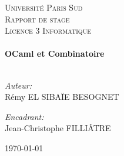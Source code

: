 \begin{titlepage}

\begin{center}



\textsc{\LARGE Université Paris Sud}\\[1.5cm]

\textsc{\Large Rapport de stage}\\[0.5cm]

\textsc{\Large Licence 3 Informatique}\\[0.5cm]

\HRule \\[0.4cm]
{ \huge \bfseries OCaml et Combinatoire}\\[0.4cm]

\HRule \\[1.5cm]

\begin{minipage}{0.4\textwidth}
\begin{flushleft} \large
\emph{Auteur:}\\
Rémy \textsc{EL SIBAÏE BESOGNET}
\end{flushleft}
\end{minipage}
\begin{minipage}{0.4\textwidth}
\begin{flushright} \large
\emph{Encadrant:} \\
Jean-Christophe \textsc{FILLIÂTRE}
\end{flushright}
\end{minipage}

\vfill

{\large \today}

\end{center}

\end{titlepage}

